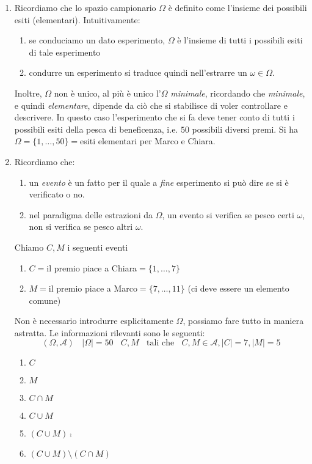 \begin{enumerate}
	\item Ricordiamo che lo spazio campionario $\Omega $ è definito come l'insieme dei possibili esiti (elementari). Intuitivamente:
\begin{enumerate}
	\item se conduciamo un dato esperimento, $\Omega $ è l'insieme di tutti i possibili esiti di tale esperimento
	\item condurre un esperimento si traduce quindi nell'estrarre un $\omega \in \Omega $.
\end{enumerate}

Inoltre, $\Omega $ non è unico, al più è unico l'$\Omega $ \textit{minimale}, ricordando che \textit{minimale}, e quindi \textit{elementare}, dipende da ciò che si stabilisce di voler controllare e descrivere. In questo caso l'esperimento che si fa deve tener conto di tutti i possibili esiti della pesca di beneficenza, i.e. $50$ possibili diversi premi. Si ha $\Omega =\{1,\dots ,50\} =$esiti elementari per Marco e Chiara.
	\item Ricordiamo che:
\begin{enumerate}
	\item un \textit{evento} è un fatto per il quale a \textit{fine} esperimento si può dire se si è verificato o no.
	\item nel paradigma delle estrazioni da $\Omega $, un evento si verifica se pesco certi $\omega $, non si verifica se pesco altri $\omega $.
\end{enumerate}

Chiamo $C,M$ i seguenti eventi
\begin{enumerate}
	\item $C=$il premio piace a Chiara$=\{1,\dots ,7\}$
	\item $M=$il premio piace a Marco$=\{7,\dots ,11\}$ (ci deve essere un elemento comune)
\end{enumerate}

\begin{oss}
Non è necessario introdurre esplicitamente $\Omega $, possiamo fare tutto in maniera astratta. Le informazioni rilevanti sono le seguenti:
\begin{equation*}
( \Omega ,\mathcal{A}) \ \ \ \ | \Omega | =50\ \ \ \ C,M\ \ \ \ \text{tali che} \ \ \ \ C,M\in \mathcal{A} ,| C| =7,| M| =5
\end{equation*}
\end{oss}
\begin{enumerate}
	\item $C$
	\item $M$
	\item $C\cap M$
	\item $C\cup M$
	\item $( C\cup M)\comp$
	\item $( C\cup M) \setminus ( C\cap M)$
\end{enumerate}


\end{enumerate}
